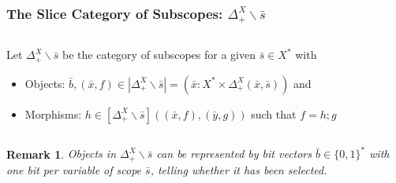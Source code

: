 \documentclass[aspectratio=169]{beamer}
\theoremstyle{remarkstyle}
\newtheorem*{remark}{Remark}
\begin{document}
\begin{frame}[fragile]
  \frametitle{The Slice Category of Subscopes: $Δ_+^X∖\bar{s}$}
  \begin{definition}
    \begin{columns}
      \begin{column}{0.68\textwidth}
        Let $Δ_+^X∖\bar{s}$ be the category of subscopes for a given $\bar{s} ∈ X^*$ with 
        \begin{itemize}
          \item Objects: $\bar{b}, (\bar{x}, f) ∈ |Δ_+^X∖\bar{s}| = \left(\bar{x} : X^* × Δ_+^X(\bar{x}, \bar{s}) \right)$ and
          \item Morphisms: $h ∈ [Δ_+^X∖\bar{s}]((\bar{x}, f), (\bar{y}, g))$ such that $f = h;g$ 
        \end{itemize}
      \end{column}
      \begin{column}{0.3\textwidth}
      \end{column}
    \end{columns}
  \end{definition}
  \begin{remark}
    Objects in $Δ_+^X∖\bar{s}$ can be represented by \emph{bit vectors} $\bar{b} ∈ \{0, 1\}^*$ with one bit per variable of scope $\bar{s}$, telling whether it has been selected.
  \end{remark}
\end{frame}
\end{document}
